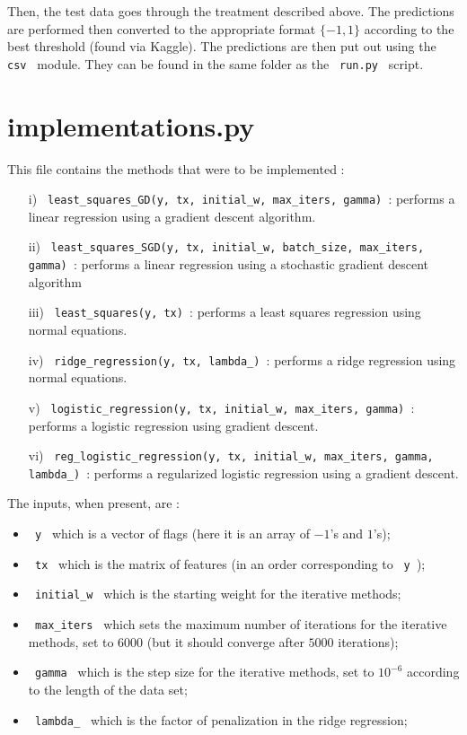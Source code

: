 \documentclass[11pt, oneside]{article}   	%
\begin{document}
Then, the test data goes through the treatment described above. The predictions are performed then converted to the appropriate format $ \{ -1, 1 \}$ according to the best threshold (found via Kaggle). The predictions are then put out using the \lstinline" csv " module. They can be found in the same folder as the \lstinline" run.py " script.

\section{implementations.py} \label{impl}

This file contains the methods that were to be implemented : 
\begin{itemize}
\item[i)] \lstinline" least_squares_GD(y, tx, initial_w, max_iters, gamma) ": performs a linear regression using a gradient descent algorithm. 
\item[ii)] \lstinline" least_squares_SGD(y, tx, initial_w, batch_size, max_iters, gamma) ": performs a linear regression using a stochastic gradient descent algorithm 

\item[iii)] \lstinline" least_squares(y, tx) ": performs a least squares regression using normal equations.
\item[iv)] \lstinline" ridge_regression(y, tx, lambda_) ": performs a ridge regression using normal equations.
\item[v)] \lstinline" logistic_regression(y, tx, initial_w, max_iters, gamma) ": performs a logistic regression using gradient descent.
\item[vi)] \lstinline" reg_logistic_regression(y, tx, initial_w, max_iters, gamma, lambda_) ": performs a regularized logistic regression using a gradient descent.
\end{itemize}
The inputs, when present, are : 
\begin{itemize}
\item \lstinline" y " which is a vector of flags (here it is an array of $-1$'s and $1$'s); 
\item \lstinline" tx " which is the matrix of features (in an order corresponding to \lstinline" y ");
\item \lstinline" initial_w " which is the starting weight for the iterative methods;
\item \lstinline" max_iters " which sets the maximum number of iterations for the iterative methods, set to $6000$ (but it should converge after $5000$ iterations);
\item \lstinline" gamma " which is the step size for the iterative methods, set to $10^{-6}$ according to the length of the data set;
\item \lstinline" lambda_ " which is the factor of penalization in the ridge regression;
\end{itemize}
\end{document}
